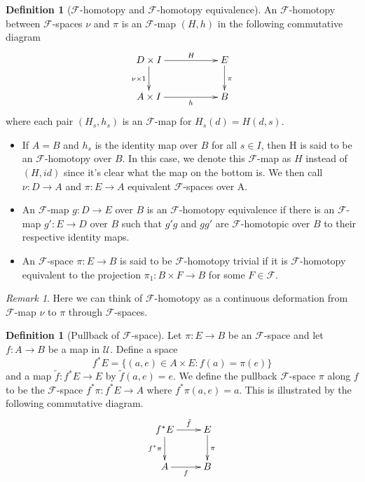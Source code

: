 \documentclass[psamsfonts]{amsart}
\theoremstyle{definition}
\newtheorem{defn}[thm]{Definition}
\theoremstyle{remark}
\newtheorem{rem}[thm]{Remark}
\numberwithin{equation}{section}
\begin{document}
\begin{defn}[$\mathcal{F}$-homotopy and $\mathcal{F}$-homotopy equivalence]
An $\mathcal{F}$-homotopy between $\mathcal{F}$-spaces $\nu$ and $\pi$ is an $\mathcal{F}$-map $(H, h)$ in the following commutative diagram
\[\xymatrix{
D\times I \ar[rr]^-{H} \ar[d]_{\nu \times 1} && E \ar[d]^{\pi} \\
A\times I \ar[rr]_-{h} && B\\} \]
where each pair $(H_{s}, h_{s})$ is an $\mathcal{F}$-map for $H_{s}(d) = H(d, s)$. 
\begin{itemize}
	\item If $A = B$ and $h_{s}$ is the identity map over $B$ for all $s \in I$, then H is said to be an $\mathcal{F}$-homotopy over $B$. In this case, we denote this $\mathcal{F}$-map as  $H$ instead of $(H, id)$ since it's clear what the map on the bottom is. We then call $\nu: D \to A$ and $\pi: E\to A$ equivalent $\mathcal{F}$-spaces over A.
	\item An $\mathcal{F}$-map $g: D \rightarrow E$  over $B$ is an $\mathcal{F}$-homotopy equivalence if there is an $\mathcal{F}$-map $g': E \rightarrow D$ over $B$ such that $g'g$ and $gg'$ are $\mathcal{F}$-homotopic over $B$ to their respective identity maps.
	\item An $\mathcal{F}$-space $\pi: E \rightarrow B$ is said to be $\mathcal{F}$-homotopy trivial if it is $\mathcal{F}$-homotopy equivalent to the projection $\pi_{1}: B \times F \rightarrow B$ for some $F \in \mathcal{F}$.
\end{itemize}
\end{defn}

\begin{rem}
Here we can think of $\mathcal{F}$-homotopy as a continuous deformation from $\mathcal{F}$-map $\nu$ to $\pi$ through $\mathcal{F}$-spaces.	
\end{rem}

\begin{defn}[Pullback of $\mathcal{F}$-space]
Let $\pi: E \rightarrow B$ be an $\mathcal{F}$-space and let $f: A \rightarrow B$ be a map in $\mathcal{U}$. Define a space $$f^{*}E = \{(a, e) \in A \times E: f(a) = \pi(e)\}$$ and a map $ \tilde{f}: f^{*}E \rightarrow E$ by $\tilde{f}(a, e) = e$. We define the pullback $\mathcal{F}$-space $\pi$ along $f$ to be the $\mathcal{F}$-space $f^{*}\pi: f^{*}E \rightarrow A$ where $ f^{*}\pi(a, e) = a$. This is illustrated by the following commutative diagram. 
\[\xymatrix{
f^{*}E \ar[r]^-{\tilde{f}} \ar[d]_{f^{*}\pi} & E \ar[d]^{\pi} \\
A \ar[r]_-{f} & B\\} \]
\end{defn}
\end{document}
